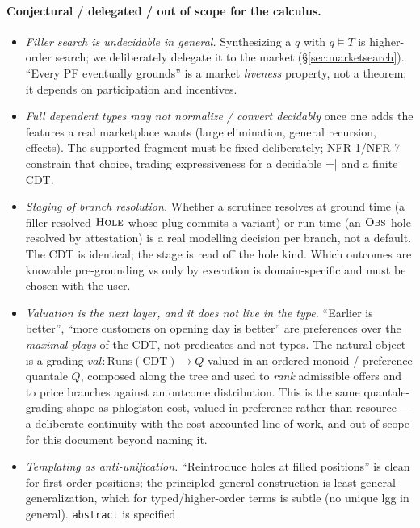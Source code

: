 \documentclass[11pt]{article}
\newcommand{\rul}[1]{\ensuremath{\textsc{#1}}}
\newcommand{\sat}{\models}
\newcommand{\code}[1]{\lstinline[language=rho,basicstyle=\ttfamily\small]|#1|}
\begin{document}
\paragraph{Conjectural / delegated / out of scope for the calculus.}
\begin{itemize}[leftmargin=1.4em,itemsep=2pt]
  \item \emph{Filler search is undecidable in general.} Synthesizing a $q$ with $q \sat T$ is
  higher-order search; we deliberately delegate it to the market (\S\ref{sec:marketsearch}). ``Every
  PF eventually grounds'' is a market \emph{liveness} property, not a theorem; it depends on
  participation and incentives.
  \item \emph{Full dependent types may not normalize / convert decidably} once one adds the features a
  real marketplace wants (large elimination, general recursion, effects). The supported fragment must
  be fixed deliberately; NFR-1/NFR-7 constrain that choice, trading expressiveness for a decidable
  \code{|=} and a finite CDT.
  \item \emph{Staging of branch resolution.} Whether a scrutinee resolves at ground time (a
  filler-resolved \rul{Hole} whose plug commits a variant) or run time (an \rul{Obs} hole resolved by
  attestation) is a real modelling decision per branch, not a default. The CDT is identical; the stage
  is read off the hole kind. Which outcomes are knowable pre-grounding vs only by execution is
  domain-specific and must be chosen with the user.
  \item \emph{Valuation is the next layer, and it does not live in the type.} ``Earlier is better'',
  ``more customers on opening day is better'' are preferences over the \emph{maximal plays} of the
  CDT, not predicates and not types. The natural object is a grading
  $\mathit{val}:\mathrm{Runs}(\mathrm{CDT})\to Q$ valued in an ordered monoid / preference quantale
  $Q$, composed along the tree and used to \emph{rank} admissible offers and to price branches against
  an outcome distribution. This is the same quantale-grading shape as phlogiston cost, valued in
  preference rather than resource --- a deliberate continuity with the cost-accounted line of work, and
  out of scope for this document beyond naming it.
  \item \emph{Templating as anti-unification.} ``Reintroduce holes at filled positions'' is clean for
  first-order positions; the principled general construction is least general generalization, which for
  typed/higher-order terms is subtle (no unique lgg in general). \code{abstract} is specified

\end{itemize}
\end{document}
